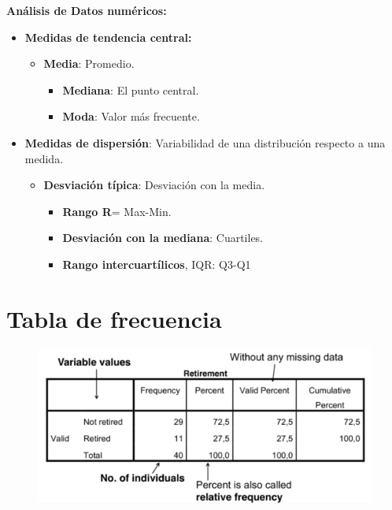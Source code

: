 \documentclass[12pt]{report} %
\begin{document}
\textbf{Análisis de Datos numéricos:}

\begin{itemize}

\item
  \textbf{Medidas de tendencia central:}

  \begin{itemize}
  
  \item
    \textbf{Media}: Promedio.

    \begin{itemize}
    
    \item
      \textbf{Mediana}: El punto central.
    \item
      \textbf{Moda}: Valor más frecuente.
    \end{itemize}
  \end{itemize}
\item
  \textbf{Medidas de dispersión}: Variabilidad de una distribución
  respecto a una medida.

  \begin{itemize}
  
  \item
    \textbf{Desviación típica}: Desviación con la media.

    \begin{itemize}
    
    \item
      \textbf{Rango R}= Max-Min.
    \item
      \textbf{Desviación con la mediana}: Cuartiles.
    \item
      \textbf{Rango intercuartílicos}, IQR: Q3-Q1
    \end{itemize}
  \end{itemize}
\end{itemize}

\section{Tabla de frecuencia}

\begin{figure}[H]
	{\includegraphics[scale=.5]{Untitled 3.png}}
\end{figure}
\end{document}
